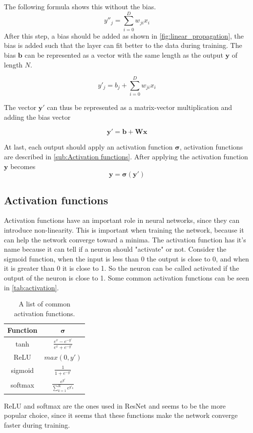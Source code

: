 The following formula shows this without the bias.
$$y''_j = \sum_{i=0}^D w_{ji}x_i  $$
After this step, a bias should be added as shown in \autoref{fig:linear_propagation}, the bias is added such that the layer can fit better to the data during training.
The bias $\bm{b}$ can be represented as a vector with the same length as the output $\bm{y}$ of length $N$.

$$y'_j = b_j + \sum_{i=0}^D w_{ji}x_i$$

The vector $\bm{y'}$ can thus be represented as a matrix-vector multiplication and adding the bias vector

$$\bm{y'} = \bm{b} + \bm{W}\bm{x}$$

At last, each output should apply an activation function $\bm{\sigma}$, activation functions are described in \autoref{sub:Activation functions}.
After applying the activation function $\bm{y}$ becomes
$$\bm{y} = \bm{\sigma} \left(\bm{y}'\right)$$

\subsection{Activation functions}%
\label{sub:Activation functions}

Activation functions have an important role in neural networks, since they can introduce non-linearity. This is important when training the network, because it can help the network converge toward a minima.
The activation function has it's name because it can tell if a neuron should "activate" or not. Consider the sigmoid function, when the input is less than 0 the output is close to $0$, and when it is greater than 0 it is close to 1. So the neuron can be called activated if the output of the neuron is close to 1.
Some common activation functions can be seen in \autoref{tab:activation}.

\begin{table}[H]
\centering
\begin{tabular}{|c|c|}\hline
\textbf{Function} & $\bm{\sigma}$ \\\hline
tanh     & $\frac{e^x - e^{-y'}}{e^x + e^{-y'}}$ \\\hline
ReLU     & $max(0, y')$ \\\hline
sigmoid  & $\frac{1}{1+e^{-y'}}$ \\\hline
softmax  & $\frac{e^{y'}}{\sum^K_{k=1} e^{y'_k}}$ \\\hline
\end{tabular}
\caption{A list of common activation functions.}
\label{tab:activation}
\end{table}
ReLU and softmax are the ones used in ResNet and seems to be the more popular choice, since it seems that these functions make the network converge faster during training.

